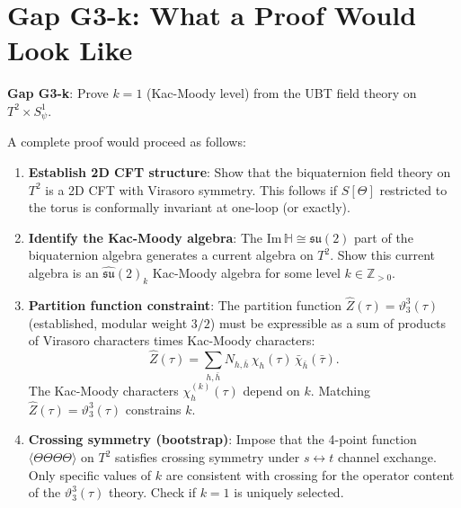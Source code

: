 \documentclass[12pt,a4paper]{article}
\theoremstyle{definition}
\theoremstyle{remark}
\begin{document}
\section{Gap G3-k: What a Proof Would Look Like}
\label{sec:bc:gap}

\begin{gapbox}
\textbf{Gap G3-k}: Prove $k = 1$ (Kac-Moody level) from the UBT field theory on
$T^2 \times S^1_\psi$.
\end{gapbox}

A complete proof would proceed as follows:

\begin{enumerate}
  \item \textbf{Establish 2D CFT structure}: Show that the biquaternion field theory
        on $T^2$ is a 2D CFT with Virasoro symmetry.  This follows if $S[\Theta]$
        restricted to the torus is conformally invariant at one-loop (or exactly).
        
  \item \textbf{Identify the Kac-Moody algebra}: The $\mathrm{Im}\,\mathbb{H} \cong
        \mathfrak{su}(2)$ part of the biquaternion algebra generates a current algebra
        on $T^2$.  Show this current algebra is an $\hat{\mathfrak{su}}(2)_k$
        Kac-Moody algebra for some level $k\in\mathbb{Z}_{>0}$.

  \item \textbf{Partition function constraint}: The partition function
        $\hat{Z}(\tau) = \vartheta_3^3(\tau)$ (established, modular weight $3/2$)
        must be expressible as a sum of products of Virasoro characters times
        Kac-Moody characters:
        \begin{equation}
          \hat{Z}(\tau) = \sum_{h, \bar{h}} N_{h,\bar{h}}\,\chi_h(\tau)\,\bar{\chi}_{\bar{h}}(\bar\tau).
          \label{eq:bc:Zchar}
        \end{equation}
        The Kac-Moody characters $\chi_h^{(k)}(\tau)$ depend on $k$.  Matching
        $\hat{Z}(\tau) = \vartheta_3^3(\tau)$ constrains $k$.
        
  \item \textbf{Crossing symmetry (bootstrap)}: Impose that the 4-point function
        $\langle\Theta\Theta\Theta\Theta\rangle$ on $T^2$ satisfies crossing symmetry
        under $s \leftrightarrow t$ channel exchange.  Only specific values of $k$ are
        consistent with crossing for the operator content of the $\vartheta_3^3(\tau)$
        theory.  Check if $k = 1$ is uniquely selected.
\end{enumerate}
\end{document}

